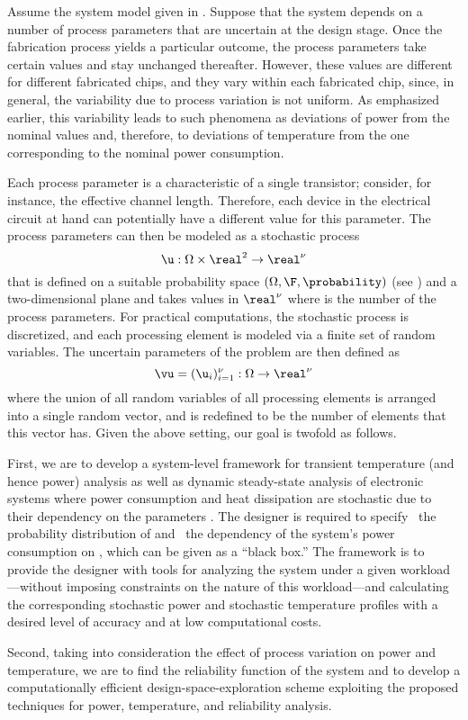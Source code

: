 Assume the system model given in . Suppose that the system
depends on a number of process parameters that are uncertain at the design
stage. Once the fabrication process yields a particular outcome, the process
parameters take certain values and stay unchanged thereafter. However, these
values are different for different fabricated chips, and they vary within each
fabricated chip, since, in general, the variability due to process variation is
not uniform. As emphasized earlier, this variability leads to such phenomena as
deviations of power from the nominal values and, therefore, to deviations of
temperature from the one corresponding to the nominal power consumption.

Each process parameter is a characteristic of a single transistor; consider, for
instance, the effective channel length. Therefore, each device in the electrical
circuit at hand can potentially have a different value for this parameter. The
process parameters can then be modeled as a stochastic process
\[
  \u: \Omega \times \real^2 \to \real^\nu
\]
that is defined on a suitable probability space $(\Omega, \F, \probability)$
(see ) and a two-dimensional plane and takes values in
$\real^\nu$ where \nu is the number of the process parameters. For practical
computations, the stochastic process is discretized, and each processing element
is modeled via a finite set of random variables. The uncertain parameters of the
problem are then defined as
\[
  \vu = (\u_i)_{i = 1}^\nu: \Omega \to \real^\nu
\]
where the union of all random variables of all processing elements is arranged
into a single random vector, and \nu is redefined to be the number of elements
that this vector has. Given the above setting, our goal is twofold as follows.

First, we are to develop a system-level framework for transient temperature (and
hence power) analysis as well as dynamic steady-state analysis of electronic
systems where power consumption and heat dissipation are stochastic due to their
dependency on the parameters \vu. The designer is required to specify \one~the
probability distribution of \vu and \two~the dependency of the system's power
consumption on \vu, which can be given as a ``black box.'' The framework is to
provide the designer with tools for analyzing the system under a given
workload---without imposing constraints on the nature of this workload---and
calculating the corresponding stochastic power \mp and stochastic temperature
\mq profiles with a desired level of accuracy and at low computational costs.

Second, taking into consideration the effect of process variation on power and
temperature, we are to find the reliability function of the system and to
develop a computationally efficient design-space-exploration scheme exploiting
the proposed techniques for power, temperature, and reliability analysis.
